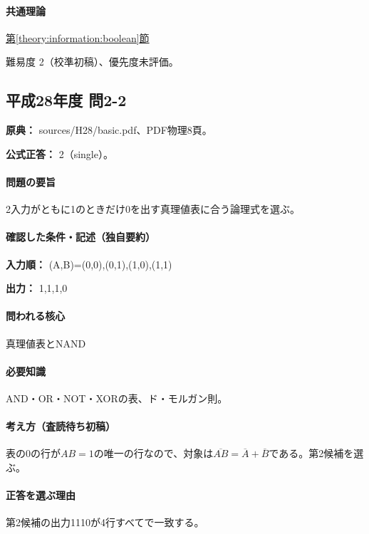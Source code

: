 \paragraph{共通理論} \hyperref[theory:information:boolean]{第\ref*{theory:information:boolean}節}

\par 難易度 2（校準初稿）、優先度未評価。

\subsection{平成28年度 問2-2}
\label{q:h28-reg-basic-2-2}

\noindent\textbf{原典：} sources/H28/basic.pdf、PDF物理8頁。

\textbf{公式正答：} 2（single）。

\paragraph{問題の要旨} 2入力がともに1のときだけ0を出す真理値表に合う論理式を選ぶ。

\paragraph{確認した条件・記述（独自要約）}\mbox{}\par

\noindent\textbf{入力順：} (A,B)=\allowbreak{}(0,0),(0,1),(1,0),(1,1)\par

\noindent\textbf{出力：} 1,1,1,0\par

\paragraph{問われる核心} 真理値表とNAND

\paragraph{必要知識} AND・OR・NOT・XORの表、ド・モルガン則。

\paragraph{考え方（査読待ち初稿）} 表の0の行が\(AB=1\)の唯一の行なので、対象は\(\overline{AB}=\overline A+\overline B\)である。第2候補を選ぶ。

\paragraph{正答を選ぶ理由} 第2候補の出力1110が4行すべてで一致する。

